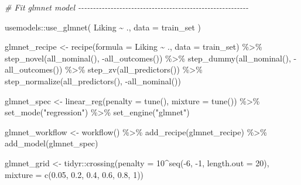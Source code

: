 \documentclass[
]{book}
\newenvironment{Shaded}{\begin{snugshade}}{\end{snugshade}}
\newcommand{\AttributeTok}[1]{\textcolor[rgb]{0.77,0.63,0.00}{#1}}
\newcommand{\CommentTok}[1]{\textcolor[rgb]{0.56,0.35,0.01}{\textit{#1}}}
\newcommand{\DecValTok}[1]{\textcolor[rgb]{0.00,0.00,0.81}{#1}}
\newcommand{\FloatTok}[1]{\textcolor[rgb]{0.00,0.00,0.81}{#1}}
\newcommand{\FunctionTok}[1]{\textcolor[rgb]{0.00,0.00,0.00}{#1}}
\newcommand{\NormalTok}[1]{#1}
\newcommand{\OtherTok}[1]{\textcolor[rgb]{0.56,0.35,0.01}{#1}}
\newcommand{\SpecialCharTok}[1]{\textcolor[rgb]{0.00,0.00,0.00}{#1}}
\newcommand{\StringTok}[1]{\textcolor[rgb]{0.31,0.60,0.02}{#1}}
\begin{document}
\begin{Shaded}
\begin{Highlighting}[]
\CommentTok{\# Fit glmnet model {-}{-}{-}{-}{-}{-}{-}{-}{-}{-}{-}{-}{-}{-}{-}{-}{-}{-}{-}{-}{-}{-}{-}{-}{-}{-}{-}{-}{-}{-}{-}{-}{-}{-}{-}{-}{-}{-}{-}{-}{-}{-}{-}{-}{-}{-}{-}{-}{-}{-}{-}{-}{-}{-}{-}{-}{-}{-}}

\NormalTok{usemodels}\SpecialCharTok{::}\FunctionTok{use\_glmnet}\NormalTok{(}
\NormalTok{  Liking }\SpecialCharTok{\textasciitilde{}}\NormalTok{ .,}
  \AttributeTok{data =}\NormalTok{ train\_set}
\NormalTok{)}

\NormalTok{glmnet\_recipe }\OtherTok{\textless{}{-}} 
  \FunctionTok{recipe}\NormalTok{(}\AttributeTok{formula =}\NormalTok{ Liking }\SpecialCharTok{\textasciitilde{}}\NormalTok{ ., }\AttributeTok{data =}\NormalTok{ train\_set) }\SpecialCharTok{\%\textgreater{}\%} 
  \FunctionTok{step\_novel}\NormalTok{(}\FunctionTok{all\_nominal}\NormalTok{(), }\SpecialCharTok{{-}}\FunctionTok{all\_outcomes}\NormalTok{()) }\SpecialCharTok{\%\textgreater{}\%} 
  \FunctionTok{step\_dummy}\NormalTok{(}\FunctionTok{all\_nominal}\NormalTok{(), }\SpecialCharTok{{-}}\FunctionTok{all\_outcomes}\NormalTok{()) }\SpecialCharTok{\%\textgreater{}\%} 
  \FunctionTok{step\_zv}\NormalTok{(}\FunctionTok{all\_predictors}\NormalTok{()) }\SpecialCharTok{\%\textgreater{}\%} 
  \FunctionTok{step\_normalize}\NormalTok{(}\FunctionTok{all\_predictors}\NormalTok{(), }\SpecialCharTok{{-}}\FunctionTok{all\_nominal}\NormalTok{())}

\NormalTok{glmnet\_spec }\OtherTok{\textless{}{-}} 
  \FunctionTok{linear\_reg}\NormalTok{(}\AttributeTok{penalty =} \FunctionTok{tune}\NormalTok{(), }\AttributeTok{mixture =} \FunctionTok{tune}\NormalTok{()) }\SpecialCharTok{\%\textgreater{}\%} 
  \FunctionTok{set\_mode}\NormalTok{(}\StringTok{"regression"}\NormalTok{) }\SpecialCharTok{\%\textgreater{}\%} 
  \FunctionTok{set\_engine}\NormalTok{(}\StringTok{"glmnet"}\NormalTok{) }

\NormalTok{glmnet\_workflow }\OtherTok{\textless{}{-}} 
  \FunctionTok{workflow}\NormalTok{() }\SpecialCharTok{\%\textgreater{}\%} 
  \FunctionTok{add\_recipe}\NormalTok{(glmnet\_recipe) }\SpecialCharTok{\%\textgreater{}\%} 
  \FunctionTok{add\_model}\NormalTok{(glmnet\_spec) }

\NormalTok{glmnet\_grid }\OtherTok{\textless{}{-}}\NormalTok{ tidyr}\SpecialCharTok{::}\FunctionTok{crossing}\NormalTok{(}\AttributeTok{penalty =} \DecValTok{10}\SpecialCharTok{\^{}}\FunctionTok{seq}\NormalTok{(}\SpecialCharTok{{-}}\DecValTok{6}\NormalTok{, }\SpecialCharTok{{-}}\DecValTok{1}\NormalTok{, }\AttributeTok{length.out =} \DecValTok{20}\NormalTok{), }
                               \AttributeTok{mixture =} \FunctionTok{c}\NormalTok{(}\FloatTok{0.05}\NormalTok{, }\FloatTok{0.2}\NormalTok{, }\FloatTok{0.4}\NormalTok{, }\FloatTok{0.6}\NormalTok{, }\FloatTok{0.8}\NormalTok{, }\DecValTok{1}\NormalTok{)) }


\end{Highlighting}
\end{Shaded}
\end{document}
